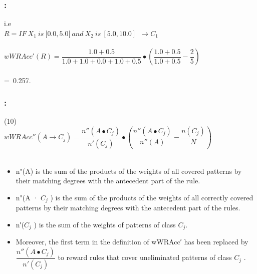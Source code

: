 \documentclass{beamer}
\begin{document}
\begin{CJK*}{UTF8}{bsmi}


\begin{frame}
	\frametitle{\insertsection : \insertsubsection}

	\begin{block}{ i.e}
		~\\
		\centering\textbf{$R = IF~ X_{1}~ is~ [0.0,5.0[ ~and ~X_{2} ~is~ [5.0,10.0]~~ → C_{1}$}\\
		~\\
		\centering\textbf{$wWRAcc'  (R)=\dfrac{1.0+0.5}{1.0+1.0+0.0+1.0+0.5}\bullet(\dfrac{1.0+0.5}{1.0+0.5}-\dfrac{2}{5})$}\\
		~\\
		=~0.257.~~~~~~~~~~~~~~~~~~~~~~~~~~~~~
		~\\
	\end{block}
	
	
\end{frame}



\begin{frame}
	\frametitle{\insertsection : \insertsubsection}
	
	\begin{block}{ (10)}
		~\\
		\centering\textbf{$wWRAcc''  (A\longrightarrow C_{j})=\dfrac{n''(A\bullet C_{j})}{n'(C_{j})}\bullet(\dfrac{n''(A\bullet C_{j})}{n''(A)}-\dfrac{n(C_{j})}{N})$}\\
		~\\
	\end{block}
{\small 		\begin{itemize}
			\item n"(A) is the sum of the products of the weights of all covered patterns by their matching degrees with the antecedent part of the rule.
			\item n"(A · $C_{j}$ ) is the sum of the products of the weights of all correctly covered patterns by their matching degrees with the antecedent part of the rules.
			\item n′($C_{j}$ ) is the sum of the weights of patterns of class $C_{j}$.
			\item Moreover, the first term
			in the definition of wWRAcc′ has been replaced by $\dfrac{n''(A\bullet C_{j})}{n'(C_{j})}$ to reward rules that cover uneliminated patterns of class $C_{j}$ .
		\end{itemize}}
	

\end{frame}
\end{CJK*}
\end{document}
